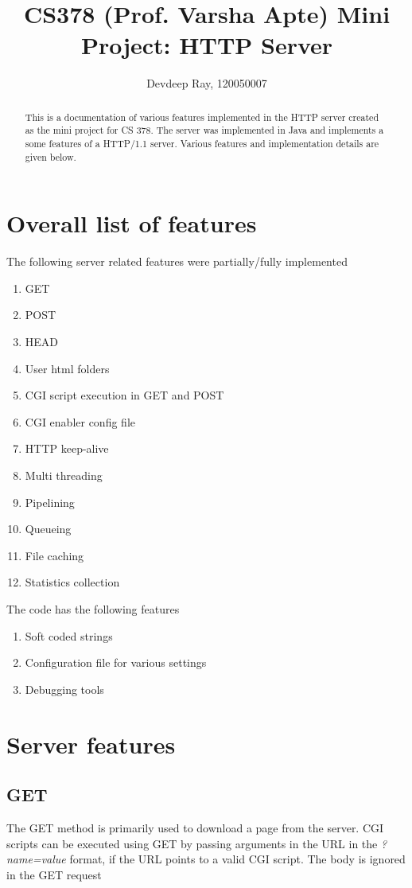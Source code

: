 \documentclass[12pt,a4paper,final]{article}
\author{Devdeep Ray, 120050007}
\title{CS378 (Prof. Varsha Apte) Mini Project: HTTP Server}
\begin{document}
\maketitle
\begin{abstract}
This is a documentation of various features implemented in the HTTP server created as the mini project for CS 378. The server was implemented in Java and implements a some features of a HTTP/1.1 server. Various features and implementation details are given below.
\end{abstract}
\section{Overall list of features}
The following server related features were partially/fully implemented
\begin{enumerate}
\item GET
\item POST
\item HEAD
\item User html folders
\item CGI script execution in GET and POST
\item CGI enabler config file
\item HTTP keep-alive
\item Multi threading
\item Pipelining
\item Queueing
\item File caching
\item Statistics collection
\end{enumerate}
The code has the following features
\begin{enumerate}
\item Soft coded strings
\item Configuration file for various settings
\item Debugging tools
\end{enumerate}
\section{Server features}
\subsection{GET}
The GET method is primarily used to download a page from the server. CGI scripts can be executed using GET by passing arguments in the URL in the \emph{?name=value} format, if the URL points to a valid CGI script. The body is ignored in the GET request
\end{document}
